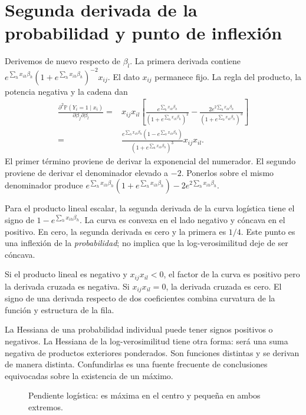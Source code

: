 \documentclass[11pt,a4paper]{article}
\newcommand{\Prob}{\mathbb P}
\begin{document}
\clearpage
\section{Segunda derivada de la probabilidad y punto de inflexión}\label{logit6}
Derivemos de nuevo respecto de $\beta_l$.
La primera derivada contiene
$e^{\sum_hx_{ih}\beta_h}(1+e^{\sum_hx_{ih}\beta_h})^{-2}x_{ij}$.
El dato $x_{ij}$ permanece fijo.
La regla del producto, la potencia negativa y la cadena dan
\[
\begin{aligned}
\frac{\partial^2\Prob(Y_i=1\mid x_i)}
{\partial\beta_j\partial\beta_l}
={}&x_{ij}x_{il}\left[
\frac{e^{\sum_hx_{ih}\beta_h}}{(1+e^{\sum_hx_{ih}\beta_h})^2}
-\frac{2e^{2\sum_hx_{ih}\beta_h}}{(1+e^{\sum_hx_{ih}\beta_h})^3}
\right]\\
={}&\frac{e^{\sum_hx_{ih}\beta_h}(1-e^{\sum_hx_{ih}\beta_h})}
{(1+e^{\sum_hx_{ih}\beta_h})^3}x_{ij}x_{il}.
\end{aligned}
\]
El primer término proviene de derivar la exponencial del numerador.
El segundo proviene de derivar el denominador elevado a $-2$.
Ponerlos sobre el mismo denominador produce
$e^{\sum_hx_{ih}\beta_h}(1+e^{\sum_hx_{ih}\beta_h})
-2e^{2\sum_hx_{ih}\beta_h}$.

Para el producto lineal escalar, la segunda derivada de la curva
logística tiene el signo de $1-e^{\sum_hx_{ih}\beta_h}$.
La curva es convexa en el lado negativo y cóncava en el positivo.
En cero, la segunda derivada es cero y la primera es $1/4$.
Este punto es una inflexión de la \emph{probabilidad}; no implica
que la log-verosimilitud deje de ser cóncava.

\begin{ejemplo}
Si el producto lineal es negativo y $x_{ij}x_{il}<0$,
el factor de la curva es positivo pero la derivada cruzada es negativa.
Si $x_{ij}x_{il}=0$, la derivada cruzada es cero.
El signo de una derivada respecto de dos coeficientes combina
curvatura de la función y estructura de la fila.
\end{ejemplo}
La Hessiana de una probabilidad individual puede tener signos positivos
o negativos. La Hessiana de la log-verosimilitud tiene otra forma:
será una suma negativa de productos exteriores ponderados.
Son funciones distintas y se derivan de manera distinta.
Confundirlas es una fuente frecuente de conclusiones equivocadas
sobre la existencia de un máximo.

\begin{figure}[H]\centering
{}
\caption{Pendiente logística: es máxima en el centro y pequeña en ambos extremos.}
\end{figure}
\end{document}
